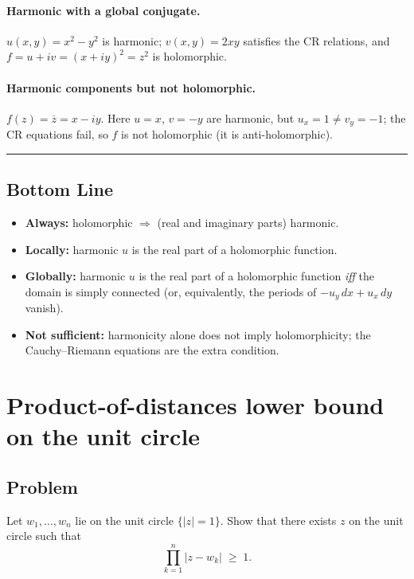 \documentclass[11pt]{article}
\begin{document}
\medskip

\paragraph{Harmonic with a global conjugate.}
$u(x,y)=x^2-y^2$ is harmonic; $v(x,y)=2xy$ satisfies the CR relations, and $f=u+iv=(x+iy)^2=z^2$ is holomorphic.

\medskip

\paragraph{Harmonic components but not holomorphic.}
$f(z)=\overline{z}=x-iy$. Here $u=x$, $v=-y$ are harmonic, but $u_x=1\neq v_y=-1$; the CR equations fail, so $f$ is not holomorphic (it is anti-holomorphic).

\bigskip\hrule\bigskip

\subsection*{Bottom Line}

\begin{itemize}
	\item \textbf{Always:} holomorphic $\Rightarrow$ (real and imaginary parts) harmonic.
	\item \textbf{Locally:} harmonic $u$ is the real part of a holomorphic function.
	\item \textbf{Globally:} harmonic $u$ is the real part of a holomorphic function \emph{iff} the domain is simply connected (or, equivalently, the periods of $-u_y\,dx+u_x\,dy$ vanish).
	\item \textbf{Not sufficient:} harmonicity alone does not imply holomorphicity; the Cauchy--Riemann equations are the extra condition.
\end{itemize}

\section*{Product-of-distances lower bound on the unit circle}

\subsection*{Problem}
Let $w_1,\dots,w_n$ lie on the unit circle $\{|z|=1\}$. Show that there exists $z$ on the unit circle such that
\[
\prod_{k=1}^n |z-w_k| \;\ge\; 1.
\]
\end{document}
